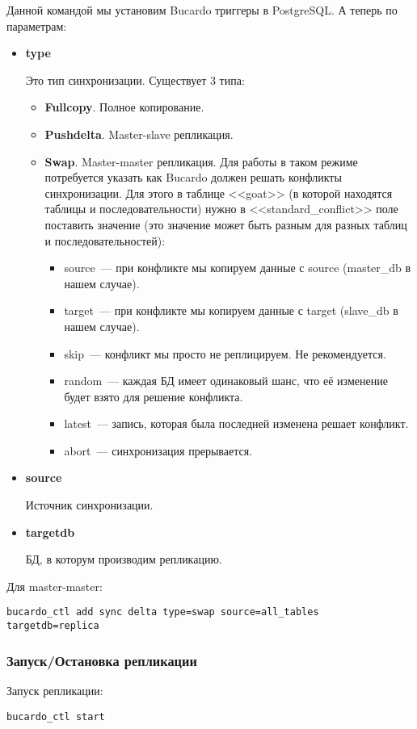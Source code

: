 Данной командой мы установим Bucardo триггеры в PostgreSQL. А теперь по параметрам:
\begin{itemize}
\item \textbf{type}

Это тип синхронизации. Существует 3 типа:
\begin{itemize}
\item \textbf{Fullcopy}. Полное копирование.
\item \textbf{Pushdelta}. Master-slave репликация.
\item \textbf{Swap}. Master-master репликация. 
Для работы в таком режиме потребуется указать как Bucardo должен решать конфликты синхронизации.
Для этого в таблице <<goat>> (в которой находятся таблицы и последовательности) нужно в <<standard\_conflict>> 
поле поставить значение (это значение может быть разным для разных таблиц и последовательностей):
\begin{itemize}
\item source~--- при конфликте мы копируем данные с source (master\_db в нашем случае).
\item target~--- при конфликте мы копируем данные с target (slave\_db в нашем случае).
\item skip~--- конфликт мы просто не реплицируем. Не рекомендуется.
\item random~--- каждая БД имеет одинаковый шанс, что её изменение будет взято для решение конфликта.
\item latest~--- запись, которая была последней изменена решает конфликт.
\item abort~--- синхронизация прерывается.
\end{itemize}
\end{itemize}

\item \textbf{source}

Источник синхронизации.

\item \textbf{targetdb}

БД, в которум производим репликацию.
\end{itemize}

Для master-master:
\begin{lstlisting}[label=lst:bucardo10,caption=Настройка синхронизации]
bucardo_ctl add sync delta type=swap source=all_tables targetdb=replica
\end{lstlisting}

\subsubsection{Запуск/Остановка репликации}
Запуск репликации:
\begin{lstlisting}[label=lst:bucardo11,caption=Запуск репликации]
bucardo_ctl start
\end{lstlisting}


